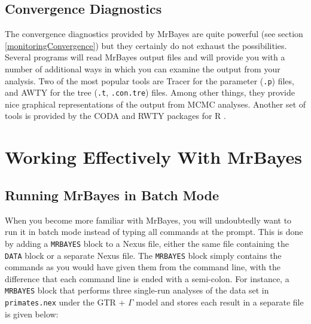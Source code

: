 \documentclass[12pt]{book}
\newcommand{\ttt}[1]{\texttt{#1}}
\begin{document}
\subsection{Convergence Diagnostics}

The convergence diagnostics provided by MrBayes are quite powerful (see section
\ref{monitoringConvergence}) but they certainly do not exhaust the possibilities. Several programs
will read MrBayes output files and will provide you with a number of additional ways in which you
can examine the output from your analysis. Two of the most popular tools are Tracer
\citep{rambaut18} for the parameter (\ttt{.p}) files, and AWTY \citep{nylander07} for the tree
(\ttt{.t}, \ttt{.con.tre}) files. Among other things, they provide nice graphical representations
of the output from MCMC analyses. Another set of tools is provided by the CODA \citep{plummer06}
and RWTY \citep{warren17} packages for R \citep{rcoreteam18}.


\section{Working Effectively With MrBayes}

\subsection{Running MrBayes in Batch Mode}

When you become more familiar with MrBayes, you will undoubtedly want to run it in batch mode
instead of typing all commands at the prompt. This is done by adding a \ttt{MRBAYES} block to a
Nexus file, either the same file containing the \ttt{DATA} block or a separate Nexus file. The
\ttt{MRBAYES} block simply contains the commands as you would have given them from the command
line, with the difference that each command line is ended with a semi-colon. For instance, a
\ttt{MRBAYES} block that performs three single-run analyses of the data set in \ttt{primates.nex}
under the GTR + $\Gamma$ model and stores each result in a separate file is given below:
\end{document}
